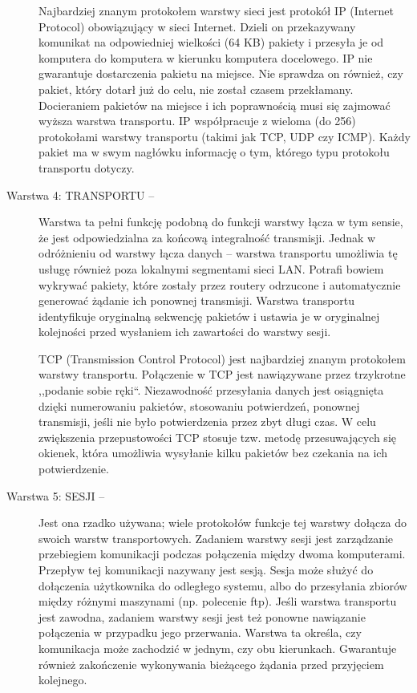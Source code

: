 \documentclass[a4paper, 10pt]{article}
\begin{document}
\begin{description}
{    Najbardziej znanym protokołem warstwy sieci jest protokół IP (Internet Protocol) obowiązujący w sieci Internet. Dzieli on przekazywany komunikat na odpowiedniej wielkości (64 KB) pakiety i przesyła je od komputera do komputera w kierunku komputera docelowego. IP nie gwarantuje dostarczenia pakietu na miejsce. Nie sprawdza on również, czy pakiet, który dotarł już do celu, nie został czasem przekłamany. Docieraniem pakietów na miejsce i ich poprawnością musi się zajmować wyższa warstwa transportu. IP współpracuje z wieloma (do 256) protokołami warstwy transportu (takimi jak TCP, UDP czy ICMP). Każdy pakiet ma w swym nagłówku informację o tym, którego typu protokołu transportu dotyczy.}
   
    \item[Warstwa 4: TRANSPORTU -- ]{Warstwa ta pełni funkcję podobną do funkcji warstwy łącza w tym sensie, że jest odpowiedzialna za końcową integralność transmisji. Jednak w odróżnieniu od warstwy łącza danych -- warstwa transportu umożliwia tę usługę również poza lokalnymi segmentami sieci LAN. Potrafi bowiem wykrywać pakiety, które zostały przez routery odrzucone i automatycznie generować żądanie ich ponownej transmisji. Warstwa transportu identyfikuje oryginalną sekwencję pakietów i ustawia je w oryginalnej kolejności przed wysłaniem ich zawartości do warstwy sesji. 
    
    TCP (Transmission Control Protocol) jest najbardziej znanym protokołem warstwy transportu. Połączenie w TCP jest nawiązywane przez trzykrotne ,,podanie sobie ręki``. Niezawodność przesyłania danych jest osiągnięta dzięki numerowaniu pakietów, stosowaniu potwierdzeń, ponownej transmisji, jeśli nie było potwierdzenia przez zbyt długi czas. W celu zwiększenia przepustowości TCP stosuje tzw. metodę przesuwających się okienek, która umożliwia wysyłanie kilku pakietów bez czekania na ich potwierdzenie.} 
    
    \item[Warstwa 5: SESJI -- ]{Jest ona rzadko używana; wiele protokołów funkcje tej warstwy dołącza do swoich warstw transportowych. Zadaniem warstwy sesji jest zarządzanie przebiegiem komunikacji podczas połączenia między dwoma komputerami. Przepływ tej komunikacji nazywany jest sesją. Sesja może służyć do dołączenia użytkownika do odległego systemu, albo do przesyłania zbiorów między różnymi maszynami (np. polecenie ftp). Jeśli warstwa transportu jest zawodna, zadaniem warstwy sesji jest też ponowne nawiązanie połączenia w przypadku jego przerwania. Warstwa ta określa, czy komunikacja może zachodzić w jednym, czy obu kierunkach. Gwarantuje również zakończenie wykonywania bieżącego żądania przed przyjęciem kolejnego. 
    
}
\end{description}
\end{document}
